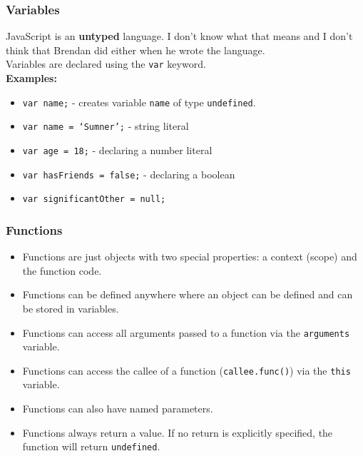 \documentclass{lug}
\begin{document}
\begin{frame}
    \frametitle{Variables}

    JavaScript is an \textbf{untyped} language. I don't know what that means and I don't
    think that Brendan did either when he wrote the language.\\

    Variables are declared using the \texttt{var} keyword\footnotemark[1]. \\

    \textbf{Examples:}

    \begin{itemize}
        \item \texttt{var name;} - creates variable \texttt{name} of type \texttt{undefined}.
        \item \texttt{var name = `Sumner';} - string literal
        \item \texttt{var age = 18;} - declaring a number literal
        \item \texttt{var hasFriends = false;} - declaring a boolean
        \item \texttt{var significantOther = null;}
    \end{itemize}

\end{frame}

\begin{frame}
    \frametitle{Functions}

    \begin{itemize}[<+->]
        \item Functions are just objects with two special properties: a context (scope) and the
            function code.
        \item Functions can be defined anywhere where an object can be defined and can be stored in
            variables.
        \item Functions can access all arguments passed to a function via the \texttt{arguments}
            variable.
        \item Functions can access the callee of a function (\texttt{callee.func()}) via the \texttt{this} variable.
        \item Functions can also have named parameters.
        \item Functions always return a value. If no return is explicitly specified, the function
            will return \texttt{undefined}.
    \end{itemize}
\end{frame}
\end{document}
